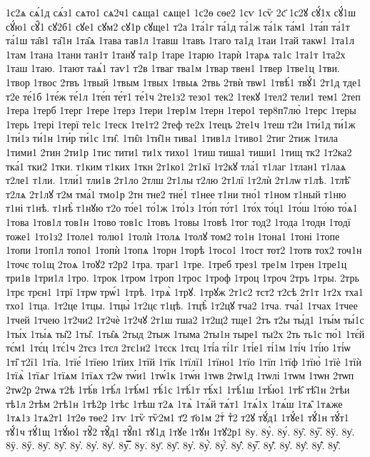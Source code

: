 {1с2ѧ
сѧ́1д
сѧ́з1
сѧто1
сѧ2ч1
сѧща1
сѧще1
1с2ѳ
сѳе2
1сѵ
1сѷ
2с҃
1с2ꙋ
сꙋ́1х
сꙋ́1ш
сꙋ́ю1
сꙋ̑1
сꙋ2б1
сꙋе1
сꙋм2
сꙋ1р
сꙋще1
т2а
1та́1г
та́1д
та́1ж
та́1к
та́м1
1та́п
та́1т
та́1ш
та̑в1
та̑1н
1та̑ѧ
1тава
тав1л
1тавш
1тавъ
1таго
та1д
1таи
1тай
такѡ1
1та1л
1там
1тана
1танн
тан1т
1танꙋ
та1р
1таре
1тарю
1тарѝ
1тарѧ
та1с
1та1т
1та2х
1таш
1таю.
1тают
таѧ́1
таѵ1
т2в
1тваг
тва1м
1твар
твен1
1твер
1тве1ц
1тви.
1твор
1твос
2твъ
1твый
1твым
1твых
1твыѧ
2твь
2твѝ
твѡ1
1твѣ́1
твꙋ́1
2т1д
тде1
т2е
те́1б
1те́ж
те́1л
1те́п
те́т1
те́1ч
2те1з2
тезо1
тек2
1текꙋ
1тел2
тели1
тем1
2теп
1тера
1терб
1терг
1тере
1терз
1тери
1тер1м
1терн
1теро1
тер8п7лю̀
1терс
1теры
1терь
1тері
1терї
те1с
1теск
1те1т2
2теф
те2х
1тецъ
2те1ч
1теш
т2и
1ти́1д
ти́1ж
1ти́1з
ти́1н
1ти́р
ти́1с
1ти̑.
1ти̑л
1ти̑1н
тива1
1тив1л
1тиво1
2тиг
2тиж
1тила
1тими1
2тин
2ти1р
1тис
тити1
ти1х
тихо1
1тиш
тиша1
тиши1
1тищ
тк2
1т2ка2
тка́1
тки2
1тки.
т1ким
т1ких
1ткн
2т1ко1
2т1кї
1т2кꙋ
тла́1
т1лаг
1тлан1
т1лаѧ
т2ле1
т1ли.
1тли́1
тли1в
2т1ло
2тлш
2т1лы
т2лю
2т1лї
1т2лѝ
2т1лѡ
т1лѣ.
1тлѣ̑
т2лѧ
2т1лꙋ
т2м
тма́1
тмо1р
2тн
тне2
тне́1
т1нее
т1ни
тно́1
т1ном
т1ный
т1ню
т1ні
т1нѣ.
т1нѣ̀
т1нꙋю
т2о
то́е1
то́1ж
1то́1з
1то́п
то́т1
1то́х
то́ц1
1то́ш
1то́ю
то́ѧ1
1това
1тов1л
тов1н
1тово
тов1с
1товъ
1товы
1товѣ
1тог
тод2
1тода
1тодн
1тодї
тоже1
1то1з2
1толе1
толю1
1толѝ
1толѧ
1толꙋ
том2
то1н
1тона1
1тоні
1топе
1топи
1топ1л
топо1
1топѝ
1топѧ
1торн
1торѣ
1тосо1
1тост
тот2
1тотв
тох2
точ1н
1точє
то1щ
2тоѧ
1тоꙋ2
т2р2
1тра.
траг1
1тре.
1треб
трез1
тре1м
1трен
1тре1ц
три1в
1три1л
1тро.
1трок
1тром
1троп
1трос
1троф
1троц
1троч
2тръ
1тры.
2трь
1трє
трєн1
1трї
1трѡ
трѡ́1
1трѣ.
1трѧ̀
1трꙋ.
1трꙋж
2т1с2
тст2
т2сѣ
2т1т
1т2х
тха1
тхо1
1тца.
1т2це
1тцы.
1тцы̀
1т2цє
т1цѣ.
1тцѣ̀
1т2цꙋ
тча2
1тча.
тча́1
1тчах
1тчее
1тчей
1тчею
1т2чи2
1т2чѐ
1т2чꙋ
2т1ш
тша2
1т2щ2
тще1
2тъ
т2ы
ты́д1
1ты́м
ты́1с
1ты́х
1ты́ѧ
ты̑2
1ты̑.
1ты̑ѧ
2тыд
2тыж
1тыма
2ты1н
тыре1
ты2х
2ть
ть1с
тю́1
1тє́й
тє́м1
1тє́ц
1тє́1ч
2тєз
1тєл
2тє1н2
1тєск
1тєц
1ті́а
ті́1г
1ті́е1
ті́1м
1ті́ч
1ті́ю
1ті́ѡ
1ті̑
т2ї1
1тїа.
1тїе́
1тїею
1тїих
1тїй
1тїк
1тїлї1
1тїно1
1тїо
1тїп
1тїф
1тїю̀
1тїѐ
1тїѝ
1тїѧ̀
1тїѧг
1тїѧм
1тїѧх
т2ѡ
тѡ́и1
1тѡ́1к
1тѡ́н
1тѡв
2тѡ1д
1тѡлі
1тѡм
1тѡн
2тѡп
2тѡ2р
2тѡѧ
т2ѣ
1тѣ́в
1тѣ́л
1тѣ́м1
тѣ́1с
1тѣ́1т
тѣ́х1
1тѣ́1ш
1тѣ́ю1
1тѣ̑
тѣ̑1н
2тѣи
тѣ1л
2тѣм
2тѣ1н
1тѣ2р
1тѣс
1тѣш
т2ѧ
1тѧ̀
1тѧ́й
тѧ́т1
1тѧ́1х
1тѧ́ш
1тѧ̑
1тѧже
1тѧ1з
1тѧ2т1
1т2ѳ
тѳе2
1тѵ
1тѷ
тѷ2м1
т҃2
т҃о1м
2тⷭ
тⷯ2
т2ꙋ
тꙋ́д1
1тꙋ́е1
тꙋ́1н
тꙋ́т1
тꙋ́1ч
тꙋ́1щ
1тꙋ́ю1
тꙋ̑2
тꙋ̑д1
тꙋ̑п1
тꙋ1д
1тꙋе
1тꙋн
1тꙋ2р1
8у.
8у̀.
8у́.
8у̂.
8у̅.
8ў.
8у̇.
8ӱ.
8ӳ.
8у̏.
8у̑.
8у̓.
8у̔.
8у̾.
8у̿.
8у͘.
8у҃.
8у҄.
8у҅.
8у҅̀.
8у҅́.
8у҅̂.
8у҅̅.
8у҅̆.
8у҅̇.
8у҅̈.
8у҅̋.
8у҅̏.
}
